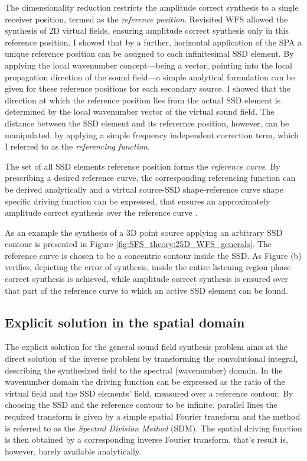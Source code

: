 \documentclass[10pt,twoside]{article}
\theoremstyle{thesisgroupstyle}
\theoremstyle{indented}
\begin{document}
The dimensionality reduction restricts the amplitude correct synthesis to a single receiver position, termed as the \emph{reference position}.
Revisited WFS allowed the synthesis of 2D virtual fields, ensuring amplitude correct synthesis only in this reference position.
I showed that by a further, horizontal application of the SPA a unique reference position can be assigned to each infinitesimal SSD element.
By applying the local wavenumber concept---being a vector, pointing into the local propagation direction of the sound field---a simple analytical formulation can be given for these reference positions for each secondary source.
I showed that the direction at which the reference position lies from the actual SSD element is determined by the local wavenumber vector of the virtual sound field.
The distance between the SSD element and its referernce position, however, can be manipulated, by applying a simple frequency independent correction term, which I referred to as the \emph{referencing function}.

The set of all SSD elements reference position forms the \emph{reference curve}.
By prescribing a desired reference curve, the corresponding referencing function can be derived analytically and a virtual source-SSD shape-reference curve shape specific driving function can be expressed, that ensures an approximately amplitude correct synthesis over the reference curve \cite{Firtha2016_booklet}.

As an example the synthesis of a 3D point source applying an arbitrary SSD contour is presented in Figure \ref{fig:SFS_theory:25D_WFS_generals}.
The reference curve is chosen to be a concentric contour inside the SSD.
As Figure (b) verifies, depicting the error of synthesis, inside the entire listening region phase correct synthesis is achieved, while amplitude correct synthesis is ensured over that part of the reference curve to which an active SSD element can be found.

\subsection{Explicit solution in the spatial domain}
The explicit solution for the general sound field synthesis problem aims at the direct solution of the inverse problem by transforming the convolutional integral, describing the synthesized field to the spectral (wavenumber) domain.
In the wavenumber domain the driving function can be expressed as the ratio of the virtual field and the SSD elements' field, measured over a reference contour.
By choosing the SSD and the reference contour to be infinite, parallel lines the required transform is given by a simple spatial Fourier transform and the method is referred to as the \emph{Spectral Division Method } (SDM).
The spatial driving function is then obtained by a corresponding inverse Fourier transform, that's result is, however, barely available analytically.
\end{document}

